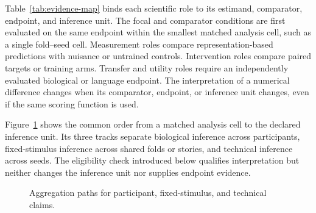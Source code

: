Table~\ref{tab:evidence-map} binds each scientific role to its estimand, comparator, endpoint, and inference unit.
The focal and comparator conditions are first evaluated on the same endpoint within the smallest matched analysis cell, such as a single fold--seed cell.
Measurement roles compare representation-based predictions with nuisance or untrained controls.
Intervention roles compare paired targets or training arms.
Transfer and utility roles require an independently evaluated biological or language endpoint.
The interpretation of a numerical difference changes when its comparator, endpoint, or inference unit changes, even if the same scoring function is used.

Figure~\ref{fig:aggregation-paths} shows the common order from a matched analysis cell to the declared inference unit.
Its three tracks separate biological inference across participants, fixed-stimulus inference across shared folds or stories, and technical inference across seeds.
The eligibility check introduced below qualifies interpretation but neither changes the inference unit nor supplies endpoint evidence.

\begin{figure}[H]
  \centering
  \resizebox{\textwidth}{!}{}
  \caption{Aggregation paths for participant, fixed-stimulus, and technical claims.}
  \label{fig:aggregation-paths}
\end{figure}
\FloatBarrier

